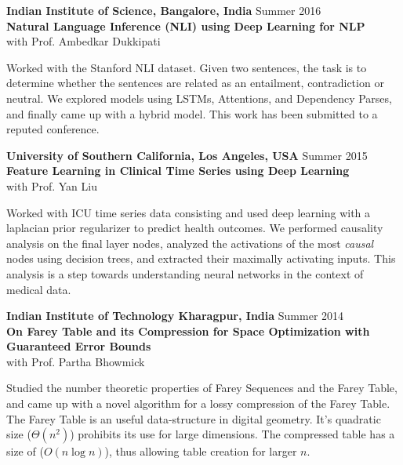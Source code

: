 \documentclass[10pt]{article}
\newcommand{\SmallEntryGap}{\vspace{0.2cm}}
\newcommand{\indentedpar}[1]{
  \hangindent=1cm \hangafter=0 #1
}
\begin{document}
\SmallEntryGap

\textbf{Indian Institute of Science, Bangalore, India} \hfill Summer 2016\\
\textbf{Natural Language Inference (NLI) using Deep Learning for NLP}\\
with Prof. Ambedkar Dukkipati

\SmallEntryGap

\indentedpar{
  Worked with the Stanford NLI dataset. Given two sentences, the task
  is to determine whether the sentences are related as an entailment, contradiction
  or neutral. We explored models using LSTMs, Attentions, and Dependency Parses,
  and finally came up with a hybrid model. This work
  has been submitted to a reputed conference.
}

\SmallEntryGap

\textbf{University of Southern California, Los Angeles, USA} \hfill Summer 2015\\
\textbf{Feature Learning in Clinical Time Series using Deep Learning}\\
with Prof. Yan Liu

\SmallEntryGap

\indentedpar{
  Worked with ICU time series data consisting and used deep learning with a laplacian 
  prior regularizer to predict health outcomes. We performed causality analysis on the 
  final layer nodes, analyzed the activations of the most \emph{causal} nodes 
  using decision trees, and extracted their maximally activating inputs. This analysis
  is a step towards understanding neural networks in the context of medical data.
}

\SmallEntryGap
\textbf{Indian Institute of Technology Kharagpur, India} \hfill Summer 2014\\
\textbf{On Farey Table and its Compression for Space Optimization with Guaranteed Error Bounds}\\
with Prof. Partha Bhowmick

\SmallEntryGap

\indentedpar{
  Studied the number theoretic properties of Farey Sequences and the
  Farey Table, and came up with a novel algorithm for a lossy compression of the 
  Farey Table. The Farey Table is an useful data-structure in digital geometry.
  It's quadratic size ($\Theta(n^2)$) prohibits its use for large dimensions. The
  compressed table has a size of ($O(n\log n)$), thus allowing table creation for
  larger $n$.
}

\SmallEntryGap
\end{document}
